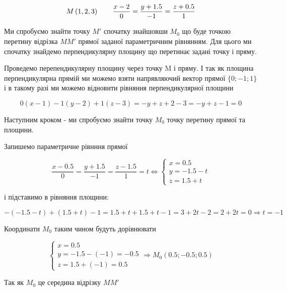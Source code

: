 {}

$$
  M \coord{1,2,3} \qquad \dfrac{x-2}{0}=\dfrac{y+1.5}{-1}=\dfrac{z+0.5}{1}
$$

Ми спробуємо знайти точку $M'$ спочатку знайшовши $M_0$ що буде точкою перетину відрізка $MM'$ прямої заданої параметричним рівнянням. Для цього ми спочатку знайдемо перпендикулярну площину що перетинає задані точку і пряму.

Проведемо перепендикулярну площину через точку M і пряму. І так як площина перпендикулярна прямій ми можемо взяти напрявляючий вектор прямої $\{0;-1;1\}$ і в такому разі ми можемо відновити рівняння перпендикулярної площини

$$
0(x-1) - 1(y-2) + 1(z-3) = -y+z+2-3 = -y+z-1 = 0
$$

Наступним кроком - ми спробуємо знайти точку $M_0$ точку перетину прямої та площини.

Запишемо параметричне рівнння прямої

$$
\dfrac{x-0.5}{0} = \dfrac{y+1.5}{-1} = \dfrac{z-1.5}{1} = t \iff
\begin{cases}
  x = 0.5 \\
  y = -1.5 - t \\
  z = 1.5+t
  \end{cases}
$$

і підставимо в рівняння площини:

$$
  -(-1.5-t)+(1.5+t)-1 = 1.5+t+1.5+t-1 = 3+2t-2 = 2+2t = 0 \Rightarrow \boxed{t = -1}
$$

Координати $M_0$ таким чином будуть дорівнювати

$$
  \begin{cases}
    x = 0.5 \\
    y = -1.5 - ( -1 ) = -0.5 \\
    z = 1.5 + ( -1 ) = 0.5
    \end{cases} \Rightarrow M_0 (0.5;-0.5;0.5)
$$

Так як $M_0$ це середина відрізку $MM'$

